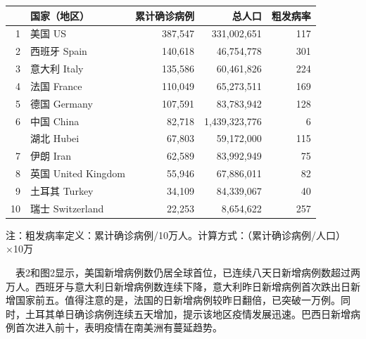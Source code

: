 \documentclass[]{article}
\begin{document}
\begin{table}[H]
  \vspace{-7mm}
    \caption{累计确诊前十位国家}
      \vspace{-0.5\baselineskip}
      \centering \begin{table}[H]
\centering\begingroup\fontsize{18}{20}\selectfont

\begin{tabular}{rlrrr}
\toprule
  & 国家（地区） & 累计确诊病例 & 总人口 & 粗发病率\\
\midrule
\rowcolor{gray!6}  1 & 美国 US & 387,547 & 331,002,651 & 117\\
2 & 西班牙 Spain & 140,618 & 46,754,778 & 301\\
\rowcolor{gray!6}  3 & 意大利 Italy & 135,586 & 60,461,826 & 224\\
4 & 法国 France & 110,049 & 65,273,511 & 169\\
\rowcolor{gray!6}  5 & 德国 Germany & 107,591 & 83,783,942 & 128\\
6 & 中国 China & 82,718 & 1,439,323,776 & 6\\
\rowcolor{gray!6}   & 湖北 Hubei & 67,803 & 59,172,000 & 115\\
7 & 伊朗 Iran & 62,589 & 83,992,949 & 75\\
\rowcolor{gray!6}  8 & 英国 United Kingdom & 55,946 & 67,886,011 & 82\\
9 & 土耳其 Turkey & 34,109 & 84,339,067 & 40\\
\rowcolor{gray!6}  10 & 瑞士 Switzerland & 22,253 & 8,654,622 & 257\\
\bottomrule
\end{tabular}
\endgroup{}
\end{table} \begin{tablenotes}
        \fontsize{15}{15}
        \selectfont
        \item 注：粗发病率定义：累计确诊病例/10万人。计算方式：（累计确诊病例/人口）×10万  %
      \end{tablenotes}
    \end{table}

\newpage

\(\quad\)表2和图2显示，美国新增病例数仍居全球首位，已连续八天日新增病例数超过两万人。西班牙与意大利日新增病例数连续下降，意大利昨日新增病例首次跌出日新增国家前五。值得注意的是，法国的日新增病例较昨日翻倍，已突破一万例。同时，土耳其单日确诊病例连续五天增加，提示该地区疫情发展迅速。巴西日新增病例首次进入前十，表明疫情在南美洲有蔓延趋势。
\end{document}
